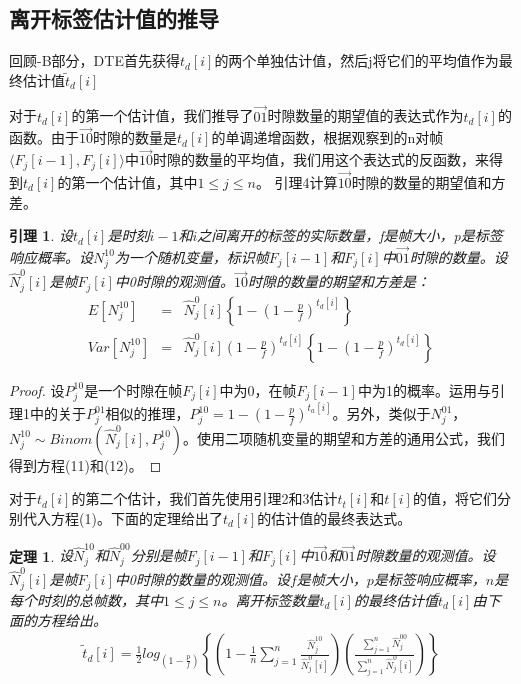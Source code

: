 \documentclass[UTF8]{ctexart}
\newcommand{\RNum}[1]{\uppercase\expandafter{\romannumeral #1\relax}}
\newtheorem{theorem}{定理}
\newtheorem{lemma}{引理}
\newtheorem*{proof}{证明}
\begin{document}
	\subsection{离开标签估计值的推导}
	回顾\RNum{2}-B部分，DTE首先获得$t_d[i]$的两个单独估计值，然后j将它们的平均值作为最终估计值$\widetilde{t}_d[i]$
	
	对于$t_d[i]$的第一个估计值，我们推导了$\overrightarrow{01}$时隙数量的期望值的表达式作为$t_d[i]$的函数。由于$\overrightarrow{10}$时隙的数量是$t_d[i]$的单调递增函数，根据观察到的n对帧$\langle F_j[i-1],F_j[i]\rangle$中$\overrightarrow{10}$时隙的数量的平均值，我们用这个表达式的反函数，来得到$t_d[i]$的第一个估计值，其中$1\leq j\leq n$。 引理4计算$\overrightarrow{10}$时隙的数量的期望值和方差。
	
	\begin{lemma}
		设$t_d[i]$是时刻$i-1$和$i$之间离开的标签的实际数量，f是帧大小，p是标签响应概率。设$N^{10}_j$为一个随机变量，标识帧$F_j[i-1]$和$F_j[i]$中$\overrightarrow{01}$时隙的数量。设$\hat{N}^0_j[i]$是帧$F_j[i]$中0时隙的观测值。$\overrightarrow{10}$时隙的数量的期望和方差是：
		\begin{eqnarray}
		E[N^10_j]&=&\hat{N}^0_j[i]\left\{1-\left(1-\frac{p}{f}\right)^{t_d[i]}\right\}\\
		Var[N^{10}_j]&=&\hat{N}^0_j[i]\left(1-\frac{p}{f}\right)^{t_d[i]}\left\{1-\left(1-\frac{p}{f}\right)^{t_d[i]}\right\}
		\end{eqnarray}
	\end{lemma}
	
	\begin{proof}
		设$P^{10}_j$是一个时隙在帧$F_j[i]$中为0，在帧$F_j[i-1]$中为1的概率。运用与引理1中的关于$P^{01}_j$相似的推理，$P^{10}_j=1-\left(1-\frac{p}{f}\right)^{t_a[i]}$。另外，类似于$N^{01}_j$，$N^{10}_j\sim Binom(\hat{N}^0_j[i],P^{10}_j)$。使用二项随机变量的期望和方差的通用公式，我们得到方程(11)和(12)。
	\end{proof}
	
	对于$t_d[i]$的第二个估计，我们首先使用引理2和3估计$t_t[i]$和$t[i]$的值，将它们分别代入方程(1)。下面的定理给出了$t_d[i]$的估计值的最终表达式。
	
	\begin{theorem}
		设$\hat{N}^{10}_j$和$\hat{N}^{00}_j$分别是帧$F_j[i-1]$和$F_j[i]$中$\overrightarrow{10}$和$\overrightarrow{01}$时隙数量的观测值。设$\hat{N}^0_j[i]$是帧$F_j[i]$中0时隙的数量的观测值。设$f$是帧大小，$p$是标签响应概率，$n$是每个时刻的总帧数，其中$1\leq j\leq n$。离开标签数量$t_d[i]$的最终估计值$\widetilde{t}_d[i]$由下面的方程给出。
		\begin{eqnarray*}
			\widetilde{t}_d[i]=\frac{1}{2}log_{\left(1-\frac{p}{f}\right)}\left\{\left(1-\frac{1}{n}\sum_{j=1}^{n}\frac{\hat{N}^{10}_j}{\hat{N}^0_j[i]}\right)\left(\frac{\sum_{j=1}^{n}\hat{N}^{00}_j}{\sum_{j=1}^{n}\hat{N}^0_j[i]}\right)\right\}
		\end{eqnarray*}
	\end{theorem}
	
\end{document}
